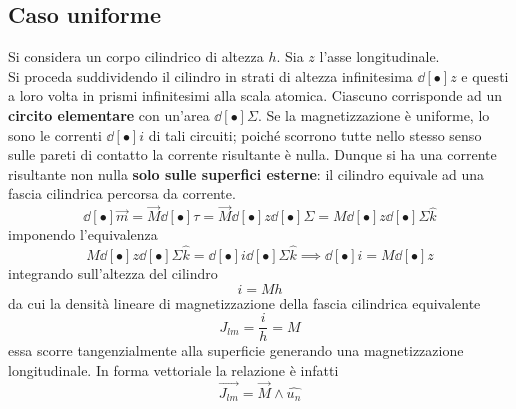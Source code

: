 \subsection{Caso uniforme}
Si considera un corpo cilindrico di altezza $h$. Sia $z$ l'asse longitudinale.
\\Si proceda suddividendo il cilindro in strati di altezza infinitesima $\dd[•]{z}$ e questi a loro volta in prismi infinitesimi alla scala atomica. Ciascuno corrisponde ad un \textbf{circito elementare} con un'area $\dd[•]{\Sigma}$. Se la magnetizzazione è uniforme, lo sono le correnti $\dd[•]{i}$ di tali circuiti; poiché scorrono tutte nello stesso senso sulle pareti di contatto la corrente risultante è nulla. Dunque si ha una corrente risultante non nulla \textbf{solo sulle superfici esterne}: il cilindro equivale ad una fascia cilindrica percorsa da corrente.
\[\dd[•]{\vec{m}} = \vec{M} \dd[•]{\tau} = \vec{M} \dd[•]{z} \dd[•]{\Sigma} = M \dd[•]{z} \dd[•]{\Sigma} \hat{k}\]
imponendo l'equivalenza
\[M \dd[•]{z} \dd[•]{\Sigma} \hat{k} = \dd[•]{i} \dd[•]{\Sigma} \hat{k} \implies \dd[•]{i} = M \dd[•]{z}\]
integrando sull'altezza del cilindro
\[i = Mh\]
da cui la densità lineare di magnetizzazione della fascia cilindrica equivalente
\[J_{lm} = \frac{i}{h} = M\]
essa scorre tangenzialmente alla superficie generando una magnetizzazione longitudinale. In forma vettoriale la relazione è infatti
\[\vec{J_{lm}} = \vec{M} \wedge \hat{u_n}\]

